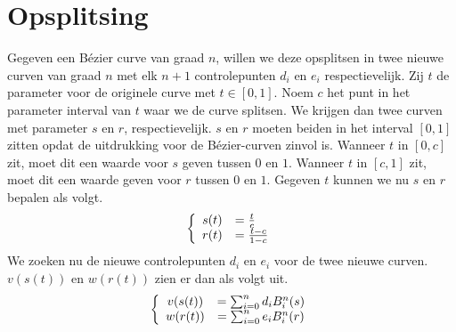 \documentclass[computergesteund_ontwerp_van_curven_en_oppervlakken.tex]{subfiles}
\begin{document}
\section{Opsplitsing}
Gegeven een B\'ezier curve van graad $n$, willen we deze opsplitsen in twee nieuwe curven van graad $n$ met elk $n+1$ controlepunten $d_i$ en $e_i$ respectievelijk.
Zij $t$ de parameter voor de originele curve met $t \in [0,1]$. 
Noem $c$ het punt in het parameter interval van $t$ waar we de curve splitsen.
We krijgen dan twee curven met parameter $s$ en $r$, respectievelijk. $s$ en $r$ moeten beiden in het interval $[0,1]$ zitten opdat de uitdrukking voor de B\'ezier-curven zinvol is.
Wanneer $t$ in $[0,c]$ zit, moet dit een waarde voor $s$ geven tussen $0$ en $1$. Wanneer $t$ in $[c,1]$ zit, moet dit een waarde geven voor $r$ tussen $0$ en $1$.
Gegeven $t$ kunnen we nu $s$ en $r$ bepalen als volgt.
\[
\left\{
\begin{array}{c l}
s(t) &= \frac{t}{c}\\
r(t) &= \frac{t-c}{1-c}\\
\end{array}
\right.
\]
We zoeken nu de nieuwe controlepunten $d_i$ en $e_i$ voor de twee nieuwe curven. $v(s(t))$ en $w(r(t))$ zien er dan als volgt uit.
\[
\left\{
\begin{array}{c c}
v(s(t)) &= \sum_{i=0}^{n}d_iB^{n}_{i}(s)\\
w(r(t)) &= \sum_{i=0}^{n}e_iB^{n}_{i}(r)
\end{array}
\right.
\]
\end{document}
